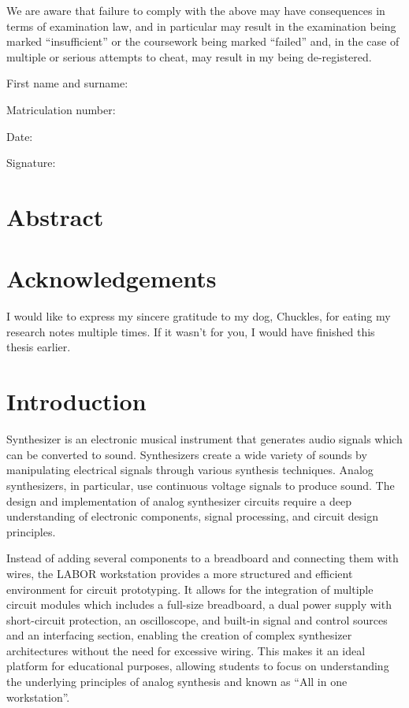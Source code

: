 \documentclass[
  11pt,
  a4paper,
  twoside]{scrbook}
\begin{document}
We are aware that failure to comply with the above may have consequences
in terms of examination law, and in particular may result in the
examination being marked ``insufficient'' or the coursework being marked
``failed'' and, in the case of multiple or serious attempts to cheat,
may result in my being de-registered.

First name and surname:

Matriculation number:

Date:

Signature:


\chapter*{Abstract}\label{abstract}



\chapter*{Acknowledgements}\label{acknowledgements}


I would like to express my sincere gratitude to my dog, Chuckles, for
eating my research notes multiple times. If it wasn't for you, I would
have finished this thesis earlier.


\chapter{Introduction}\label{sec-intro}

Synthesizer is an electronic musical instrument that generates audio
signals which can be converted to sound. Synthesizers create a wide
variety of sounds by manipulating electrical signals through various
synthesis techniques. Analog synthesizers, in particular, use continuous
voltage signals to produce sound. The design and implementation of
analog synthesizer circuits require a deep understanding of electronic
components, signal processing, and circuit design principles.

Instead of adding several components to a breadboard and connecting them
with wires, the LABOR workstation provides a more structured and
efficient environment for circuit prototyping. It allows for the
integration of multiple circuit modules which includes a full-size
breadboard, a dual power supply with short-circuit protection, an
oscilloscope, and built-in signal and control sources and an interfacing
section, enabling the creation of complex synthesizer architectures
without the need for excessive wiring. This makes it an ideal platform
for educational purposes, allowing students to focus on understanding
the underlying principles of analog synthesis and known as ``All in one
workstation''.
\end{document}
